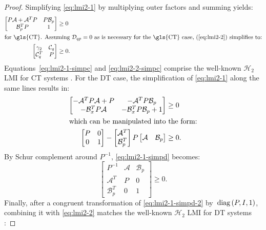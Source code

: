 \begin{proof}
	Simplifying \autoref{eq:lmi2-1} by multiplying outer factors and summing yields:
	\begin{align}
		\begin{bmatrix}
			P\mathcal{A} + \mathcal{A}^TP & P\mathcal{B}_p \\
			\mathcal{B}_p^TP & 1
		\end{bmatrix} &\geq 0 \label{eq:lmi2-1-simpc} \\
		\shortintertext{for \gls{CT}. Assuming $\mathcal{D}_{qp} = 0$ as is necessary for the \gls{CT} case, (\ref{eq:lmi2-2}) simplifies to:}
		\begin{bmatrix}
			\gamma_2 & \mathcal{C}_q \\
			\mathcal{C}_q^T & P
		\end{bmatrix} &\geq 0 \label{eq:lmi2-2-simpc}.
	\end{align}
	Equations~\ref{eq:lmi2-1-simpc} and \ref{eq:lmi2-2-simpc} comprise the well-known $\mathcal{H}_2$ \gls{LMI} for \gls{CT} systems \cite{Scherer1997, Masubuchi1998}. For the \gls{DT} case, the simplification of \autoref{eq:lmi2-1} along the same lines results in:
	\begin{align}
		\begin{bmatrix}
			-\mathcal{A}^TP\mathcal{A} + P & -\mathcal{A}^TP\mathcal{B}_p \\
			-\mathcal{B}_x^TP\mathcal{A} & -\mathcal{B}_x^TP\mathcal{B}_p + 1
		\end{bmatrix} &\geq 0 \\
		\shortintertext{which can be manipulated into the form:}
		\begin{bmatrix}
			P & 0 \\
			0 & 1
		\end{bmatrix} -
		\begin{bmatrix}
			\mathcal{A}^T \\
			\mathcal{B}_p^T
		\end{bmatrix} P
		\begin{bmatrix}
			\mathcal{A} & \mathcal{B}_p
		\end{bmatrix} &\geq 0 \label{eq:lmi2-1-simpd}.
	\end{align}
	By Schur complement around $P^{-1}$, \autoref{eq:lmi2-1-simpd} becomes:
	\begin{equation}
		\begin{bmatrix}
			P^{-1} & \mathcal{A} & \mathcal{B}_p \\
			\mathcal{A}^T & P & 0 \\
			\mathcal{B}_p^T & 0 & 1
		\end{bmatrix} \geq 0 \label{eq:lmi2-1-simpd-2}.
	\end{equation}
	Finally, after a congruent transformation of \autoref{eq:lmi2-1-simpd-2} by~$\operatorname{diag}\left(P, I, 1\right)$, combining it with \autoref{eq:lmi2-2} matches the well-known $\mathcal{H}_2$ \gls{LMI} for \gls{DT} systems \cite{Masubuchi1998}:
	

\end{proof}
